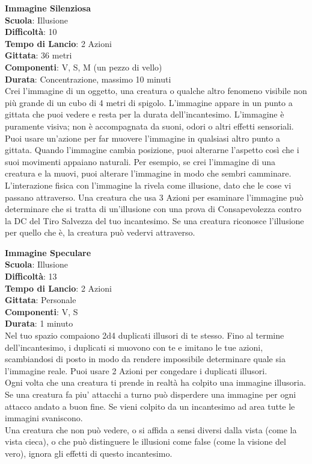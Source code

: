 \begin{multicols}{2}
\medskip\textbf{Immagine Silenziosa}\\
\textbf{Scuola}: Illusione\\
\textbf{Difficoltà}: 10\\
\textbf{Tempo di Lancio}: 2 Azioni\\
\textbf{Gittata}: 36 metri\\
\textbf{Componenti}: V, S, M (un pezzo di vello)\\
\textbf{Durata}: Concentrazione, massimo 10 minuti\\
Crei l'immagine di un oggetto, una creatura o qualche altro fenomeno visibile non più grande di un cubo di 4 metri di spigolo. L'immagine appare in un punto a gittata che puoi vedere e resta per la durata dell'incantesimo. L'immagine è puramente visiva; non è accompagnata da suoni, odori o altri effetti sensoriali. Puoi usare un'azione per far muovere l'immagine in qualsiasi altro punto a gittata. Quando l'immagine cambia posizione, puoi alterarne l'aspetto così che i suoi movimenti appaiano naturali. Per esempio, se crei l'immagine di una creatura e la muovi, puoi alterare l'immagine in modo che sembri camminare.\\
L'interazione fisica con l'immagine la rivela come illusione, dato che le cose vi passano attraverso. Una creatura che usa 3 Azioni per esaminare l'immagine può determinare che si tratta di un'illusione con una prova di Consapevolezza contro la DC del Tiro Salvezza del tuo incantesimo. Se una creatura riconosce l'illusione per quello che è, la creatura può vedervi attraverso.

\medskip\textbf{Immagine Speculare}\\
\textbf{Scuola}: Illusione\\
\textbf{Difficoltà}: 13\\
\textbf{Tempo di Lancio}: 2 Azioni\\
\textbf{Gittata}: Personale\\
\textbf{Componenti}: V, S\\
\textbf{Durata}: 1 minuto\\
Nel tuo spazio compaiono 2d4 duplicati illusori di te stesso. Fino al termine dell'incantesimo, i duplicati si muovono con te e imitano le tue azioni, scambiandosi di posto in modo da rendere impossibile determinare quale sia l'immagine reale. Puoi usare 2 Azioni per congedare i duplicati illusori.\\
Ogni volta che una creatura ti prende in realtà ha colpito una immagine illusoria.
Se una creatura fa piu' attacchi a turno può disperdere una immagine per ogni attacco andato a buon fine. Se vieni colpito da un incantesimo ad area tutte le immagini svaniscono.\\
Una creatura che non può vedere, o si affida a sensi diversi dalla vista (come la vista cieca), o che può distinguere le illusioni come false (come la visione del vero), ignora gli effetti di questo incantesimo. 


\end{multicols}
